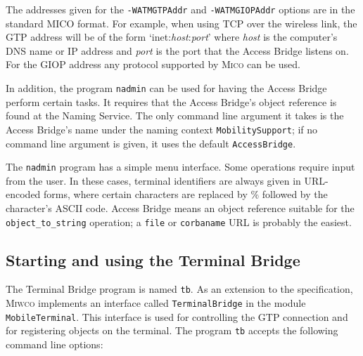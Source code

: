 \documentclass[12pt,a4paper,draft]{article}
\newcommand{\MICO}{\textsc{Mico}}
\newcommand{\MIWCO}{\textsc{Miwco}}
\begin{document}
The addresses given for the \texttt{-WATMGTPAddr} and
\texttt{-WATMGIOPAddr} options are in the standard MICO format.  For
example, when using TCP over the wireless link, the GTP address
will be of the form `inet:\textit{host}:\textit{port}' where
\textit{host} is the computer's DNS name or IP address and
\textit{port} is the port that the Access Bridge listens on.  For the
GIOP address any protocol supported by \MICO{} can be used.

In addition, the program \texttt{nadmin} can be used for having the
Access Bridge perform certain tasks.  It requires that the Access
Bridge's object reference is found at the Naming Service.  The only
command line argument it takes is the Access Bridge's name under the
naming context \texttt{MobilitySupport}; if no command line argument
is given, it uses the default \texttt{AccessBridge}.

The \texttt{nadmin} program has a simple menu interface.  Some
operations require input from the user.  In these cases, terminal
identifiers are always given in URL-encoded forms, where certain
characters are replaced by \% followed by the character's ASCII code.
Access Bridge means an object reference suitable for the
\texttt{object\_to\_string} operation; a \texttt{file} or
\texttt{corbaname} URL is probably the easiest.

\subsection{Starting and using the Terminal Bridge}

The Terminal Bridge program is named \texttt{tb}.  As an extension to
the specification, \MIWCO{} implements an interface called
\texttt{TerminalBridge} in the module \texttt{MobileTerminal}.  This
interface is used for controlling the GTP connection and for
registering objects on the terminal.  The program \texttt{tb} accepts
the following command line options:
\end{document}
